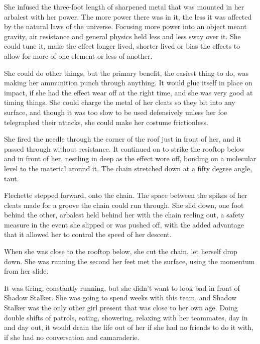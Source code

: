 She infused the three-foot length of sharpened metal that was mounted in her arbalest with her power.  The more power there was in it, the less it was affected by the natural laws of the universe.  Focusing more power into an object meant gravity, air resistance and general physics held less and less sway over it.  She could tune it, make the effect longer lived, shorter lived or bias the effects to allow for more of one element or less of another.



She could do other things, but the primary benefit, the easiest thing to do, was making her ammunition punch through anything.  It would glue itself in place on impact, if she had the effect wear off at the right time, and she was very good at timing things.  She could charge the metal of her cleats so they bit into any surface, and though it was too slow to be used defensively unless her foe telegraphed their attacks, she could make her costume frictionless.



She fired the needle through the corner of the roof just in front of her, and it passed through without resistance.  It continued on to strike the rooftop below and in front of her, nestling in deep as the effect wore off, bonding on a molecular level to the material around it.  The chain stretched down at a fifty degree angle, taut.



Flechette stepped forward, onto the chain.  The space between the spikes of her cleats made for a groove the chain could run through.  She slid down, one foot behind the other, arbalest held behind her with the chain reeling out, a safety measure in the event she slipped or was pushed off, with the added advantage that it allowed her to control the speed of her descent.



When she was close to the rooftop below, she cut the chain, let herself drop down.  She was running the second her feet met the surface, using the momentum from her slide.



It was tiring, constantly running, but she didn't want to look bad in front of Shadow Stalker.  She was going to spend weeks with this team, and Shadow Stalker was the only other girl present that was close to her own age.  Doing double shifts of patrols, eating, showering, relaxing with her teammates, day in and day out, it would drain the life out of her if she had no friends to do it with, if she had no conversation and camaraderie.



